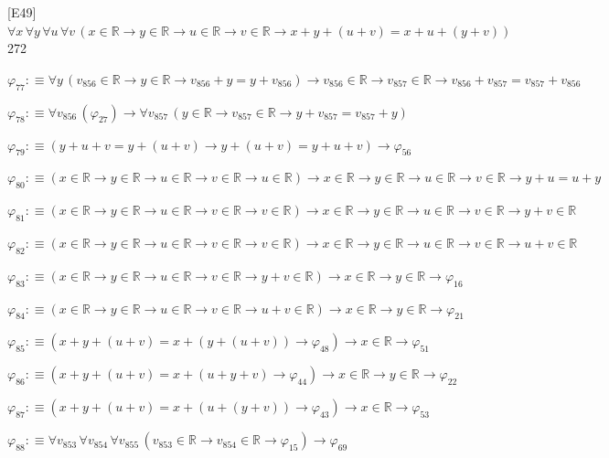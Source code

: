 \begin{fullproof}{[E49]}{$\forall x\,\forall y\,\forall u\,\forall v\,(x \in \mathbb{R} \to y \in \mathbb{R} \to u \in \mathbb{R} \to v \in \mathbb{R} \to x + y + (u + v) = x + u + (y + v))$}{272}
\begin{abbrevlist}
\item $\varphi_{77} :\equiv \forall y\,(v_{856} \in \mathbb{R} \to y \in \mathbb{R} \to v_{856} + y = y + v_{856}) \to v_{856} \in \mathbb{R} \to v_{857} \in \mathbb{R} \to v_{856} + v_{857} = v_{857} + v_{856}$
\item $\varphi_{78} :\equiv \forall v_{856}\,(\varphi_{27}) \to \forall v_{857}\,(y \in \mathbb{R} \to v_{857} \in \mathbb{R} \to y + v_{857} = v_{857} + y)$
\item $\varphi_{79} :\equiv (y + u + v = y + (u + v) \to y + (u + v) = y + u + v) \to \varphi_{56}$
\item $\varphi_{80} :\equiv (x \in \mathbb{R} \to y \in \mathbb{R} \to u \in \mathbb{R} \to v \in \mathbb{R} \to u \in \mathbb{R}) \to x \in \mathbb{R} \to y \in \mathbb{R} \to u \in \mathbb{R} \to v \in \mathbb{R} \to y + u = u + y$
\item $\varphi_{81} :\equiv (x \in \mathbb{R} \to y \in \mathbb{R} \to u \in \mathbb{R} \to v \in \mathbb{R} \to v \in \mathbb{R}) \to x \in \mathbb{R} \to y \in \mathbb{R} \to u \in \mathbb{R} \to v \in \mathbb{R} \to y + v \in \mathbb{R}$
\item $\varphi_{82} :\equiv (x \in \mathbb{R} \to y \in \mathbb{R} \to u \in \mathbb{R} \to v \in \mathbb{R} \to v \in \mathbb{R}) \to x \in \mathbb{R} \to y \in \mathbb{R} \to u \in \mathbb{R} \to v \in \mathbb{R} \to u + v \in \mathbb{R}$
\item $\varphi_{83} :\equiv (x \in \mathbb{R} \to y \in \mathbb{R} \to u \in \mathbb{R} \to v \in \mathbb{R} \to y + v \in \mathbb{R}) \to x \in \mathbb{R} \to y \in \mathbb{R} \to \varphi_{16}$
\item $\varphi_{84} :\equiv (x \in \mathbb{R} \to y \in \mathbb{R} \to u \in \mathbb{R} \to v \in \mathbb{R} \to u + v \in \mathbb{R}) \to x \in \mathbb{R} \to y \in \mathbb{R} \to \varphi_{21}$
\item $\varphi_{85} :\equiv (x + y + (u + v) = x + (y + (u + v)) \to \varphi_{48}) \to x \in \mathbb{R} \to \varphi_{51}$
\item $\varphi_{86} :\equiv (x + y + (u + v) = x + (u + y + v) \to \varphi_{44}) \to x \in \mathbb{R} \to y \in \mathbb{R} \to \varphi_{22}$
\item $\varphi_{87} :\equiv (x + y + (u + v) = x + (u + (y + v)) \to \varphi_{43}) \to x \in \mathbb{R} \to \varphi_{53}$
\item $\varphi_{88} :\equiv \forall v_{853}\,\forall v_{854}\,\forall v_{855}\,(v_{853} \in \mathbb{R} \to v_{854} \in \mathbb{R} \to \varphi_{15}) \to \varphi_{69}$

\end{abbrevlist}
\end{fullproof}
